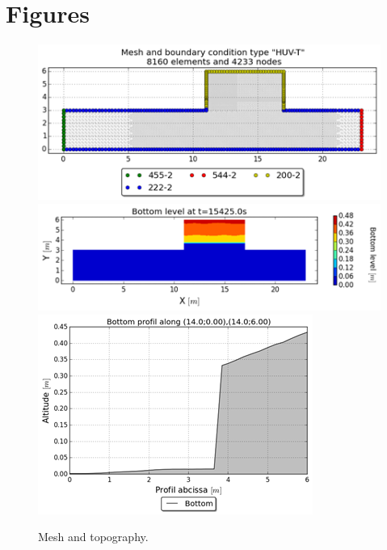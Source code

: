 \section{Figures}
\begin{figure}
 \centering
 \includegraphics{img/image136}
 \includegraphics{img/image137}
 \includegraphics{img/image138}
 \caption{Mesh and topography.}\label{fig:cavity:mesh}
\end{figure}


